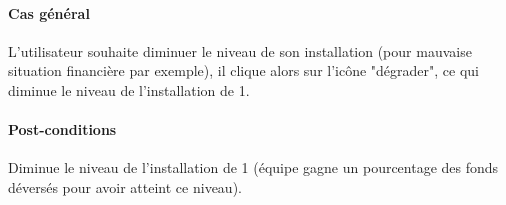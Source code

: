 \paragraph{Cas général}
L'utilisateur souhaite diminuer le niveau de son installation (pour mauvaise situation financière par exemple), il clique alors sur l'icône "dégrader", ce qui diminue le niveau de l'installation de 1. 
\paragraph{Post-conditions}
Diminue le niveau de l'installation de 1 (équipe gagne un pourcentage des fonds déversés pour avoir atteint ce niveau).


